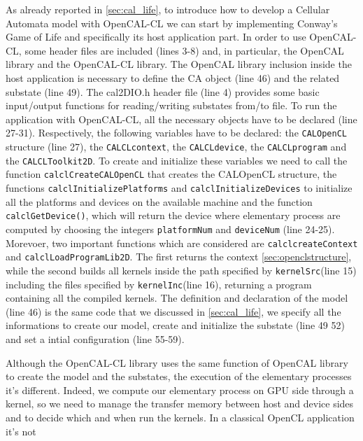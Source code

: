 As already reported in \ref{sec:cal_life}, to introduce how to develop a
Cellular Automata model with OpenCAL-CL we can start by implementing Conway’s
Game of Life and specifically its host application part. In order to use OpenCAL-CL, some
header files are included (lines 3-8) and, in particular, the OpenCAL library and
the OpenCAL-CL library. The OpenCAL library
inclusion inside the host application is necessary to define the CA object
(line 46) and the related substate (line 49). The cal2DIO.h header
file (line 4) provides some basic input/output functions for
reading/writing substates from/to file. To run the application with
OpenCAL-CL, all the necessary objects have to be declared (line
27-31). Respectively, the following variables have to be declared: the
\verb'CALOpenCL' structure (line 27), the \verb'CALCLcontext', the
\verb'CALCLdevice', the \verb'CALCLprogram' and the
\verb'CALCLToolkit2D'.  To create and initialize these variables we
need to call the function \verb'calclCreateCALOpenCL' that creates the
CALOpenCL structure, the functions \verb|calclInitializePlatforms| and
\verb|calclInitializeDevices| to initialize all the platforms and
devices on the available machine and the function \verb'calclGetDevice()', which
will return the device where elementary process are computed by
choosing the integers \verb'platformNum' and \verb'deviceNum' (line
24-25).  Morevoer, two important functions which are considered are \verb'calclcreateContext'
and \verb'calclLoadProgramLib2D'.  The first returns the context
\ref{sec:openclstructure}, while the second builds all kernels inside the
path specified by \verb'kernelSrc'(line 15) including the files
specified by \verb'kernelInc'(line 16), returning a program
containing all the compiled kernels.
The definition and declaration of the model (line 46) is the same code
that we discussed in \ref{sec:cal_life}, we specify all the informations
to create our model, create and initialize the substate (line 49 52) and 
set a intial configuration (line 55-59).

Although the OpenCAL-CL library uses the same function of OpenCAL
library to create the model and the substates, the execution of the
elementary processes it's different. Indeed, we compute our elementary
process on GPU side through a kernel, so we need to manage the
transfer memory between host and device sides and to decide which and
when run the kernels. In a classical OpenCL application it's not
